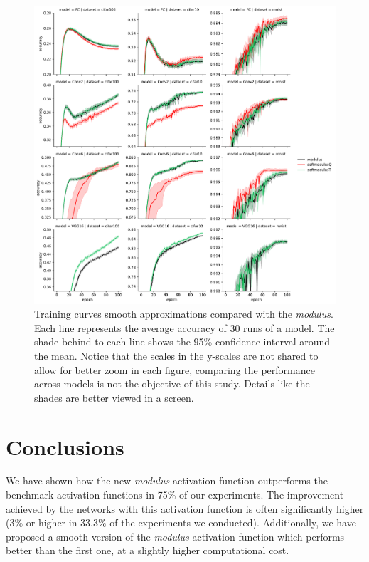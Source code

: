 \begin{figure}[h!]
	\centering
	\includegraphics[width=1.0\linewidth]{modulus/images/training_curves_smooth}
	\caption{Training curves smooth approximations compared with the \textit{modulus}. Each line represents the average accuracy of 30 runs of a model. The shade behind to each line shows the 95\% confidence interval around the mean. Notice that the scales in the y-scales are not shared to allow for better zoom in each figure, comparing the performance across models is not the objective of this study. Details like the shades are better viewed in a screen.}
	\label{fig:training_curves_smooth}
\end{figure}



\section{Conclusions} \label{sec:conclusions}
We have shown how the new \textit{modulus} activation function outperforms the benchmark activation functions in 75\% of our experiments. The improvement achieved by the networks with this activation function is often significantly higher ($3\%$ or higher in 33.3$\%$ of the experiments we conducted). Additionally, we have proposed a smooth version of the \textit{modulus} activation function which performs better than the first one, at a slightly higher computational cost. 

